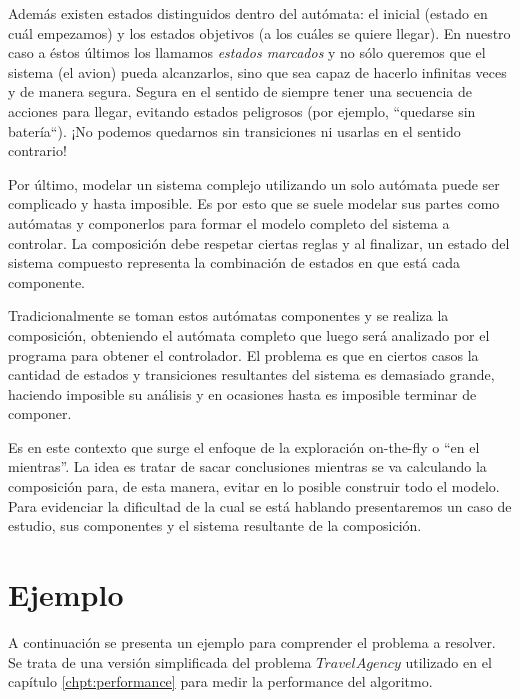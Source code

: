 Además existen estados distinguidos dentro del autómata: el inicial (estado en cuál empezamos) y los estados objetivos (a los cuáles se quiere llegar). En nuestro caso a éstos últimos los llamamos \textit{estados marcados} y no sólo queremos que el sistema (el avion) pueda alcanzarlos, sino que sea capaz de hacerlo infinitas veces y de manera segura. Segura en el sentido de siempre tener una secuencia de acciones para llegar, evitando estados peligrosos (por ejemplo, ``quedarse sin batería``). ¡No podemos quedarnos sin transiciones ni usarlas en el sentido contrario!

Por último, modelar un sistema complejo utilizando un solo autómata puede ser complicado y hasta imposible. Es por esto que se suele modelar sus partes como autómatas y componerlos para formar el modelo completo del sistema a controlar. La composición debe respetar ciertas reglas y al finalizar, un estado del sistema compuesto representa la combinación de estados en que está cada componente.

Tradicionalmente se toman estos autómatas componentes y se realiza la composición, obteniendo el autómata completo que luego será analizado por el programa para obtener el controlador. El problema es que en ciertos casos la cantidad de estados y transiciones resultantes del sistema es demasiado grande, haciendo imposible su análisis y en ocasiones hasta es imposible terminar de componer.

Es en este contexto que surge el enfoque de la exploración on-the-fly o ``en el mientras''. La idea es tratar de sacar conclusiones mientras se va calculando la composición para, de esta manera, evitar en lo posible construir todo el modelo. Para evidenciar la dificultad de la cual se está hablando presentaremos un caso de estudio, sus componentes y el sistema resultante de la composición.


\section{Ejemplo}\label{chpt:casoAviones}
A continuación se presenta un ejemplo para comprender el problema a resolver. Se trata de una versión simplificada del problema $Travel Agency$ utilizado en el capítulo \ref{chpt:performance} para medir la performance del algoritmo.

